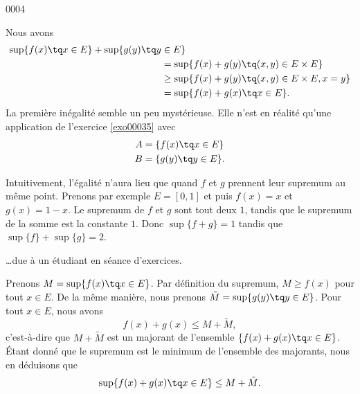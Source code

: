 
\begin{corrige}{0004}

Nous avons
\begin{equation}
	\begin{aligned}[]
		\sup\{ f(x)\tq x\in E \}+\sup\{ g(y)\tq y&\in E \}\\
							&=\sup\{ f(x)+g(y)\tq (x,y)\in E\times E \}\\
									&\geq\sup\{  f(x)+g(y)\tq (x,y)\in E\times E, x=y \} \\
							&=\sup\{ f(x)+g(x)\tq x\in E \}.
	\end{aligned}
\end{equation}
La première inégalité semble un peu mystérieuse. Elle n'est en réalité qu'une application de l'exercice \ref{exo00035} avec
\begin{equation}
	\begin{aligned}[]
		A&=\{ f(x)\tq x\in E \}\\
		B&=\{ g(y)\tq y\in E \}.
	\end{aligned}
\end{equation}

Intuitivement, l'égalité n'aura lieu que quand $f$ et $g$ prennent leur supremum au même point. Prenons par exemple $E=[0,1]$ et puis $f(x)=x$ et $g(x)=1-x$. Le supremum de $f$ et $g$ sont tout deux $1$, tandis que le supremum de la somme est la constante $1$. Donc $\sup\{ f+g \}=1$ tandis que $\sup\{ f \}+\sup\{ g \}=2$.

\vspace{0.5cm}

\ldots due à un étudiant en séance d'exercices.

Prenons $M=\sup\{ f(x)\tq x\in E \}$. Par définition du supremum, $M\geq f(x)$ pour tout $x\in E$. De la même manière, nous prenons $\tilde M=\sup\{ g(y)\tq y\in E \}$. Pour tout $x\in E$, nous avons
\begin{equation}
	f(x)+g(x)\leq M+\tilde M,
\end{equation}
c'est-à-dire que $M+\tilde M$ est un majorant de l'ensemble $\{ f(x)+g(x)\tq x\in E \}$. Étant donné que le supremum est le minimum de l'ensemble des majorants, nous en déduisons que
\begin{equation}
	\sup\{ f(x)+g(x)\tq x\in E \}\leq M+\tilde M.
\end{equation}

\end{corrige}
